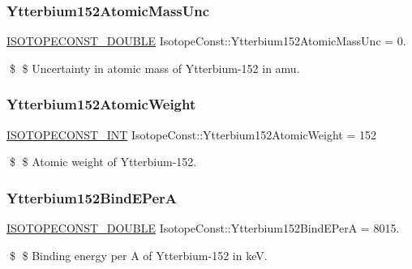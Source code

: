 \subsubsection{\texorpdfstring{Ytterbium152\+Atomic\+Mass\+Unc}{Ytterbium152AtomicMassUnc}}
{\footnotesize\ttfamily \mbox{\hyperlink{group___isotope_const-_macros_ga8f45a7272ce02c0b4c65c44636ed719a}{I\+S\+O\+T\+O\+P\+E\+C\+O\+N\+S\+T\+\_\+\+D\+O\+U\+B\+LE}} Isotope\+Const\+::\+Ytterbium152\+Atomic\+Mass\+Unc = 0.}

\$ \$ Uncertainty in atomic mass of Ytterbium-\/152 in amu. \mbox{\label{group___isotope_const-_ytterbium-_yb152_gaf8dc85b3a3cf625b206d601cdd4a695c}} 
\subsubsection{\texorpdfstring{Ytterbium152\+Atomic\+Weight}{Ytterbium152AtomicWeight}}
{\footnotesize\ttfamily \mbox{\hyperlink{group___isotope_const-_macros_ga5f18360b3e99483a35c32d789e62621c}{I\+S\+O\+T\+O\+P\+E\+C\+O\+N\+S\+T\+\_\+\+I\+NT}} Isotope\+Const\+::\+Ytterbium152\+Atomic\+Weight = 152}

\$ \$ Atomic weight of Ytterbium-\/152. \mbox{\label{group___isotope_const-_ytterbium-_yb152_gaa338021565e100b2696062ef1a542768}} 
\subsubsection{\texorpdfstring{Ytterbium152\+Bind\+E\+PerA}{Ytterbium152BindEPerA}}
{\footnotesize\ttfamily \mbox{\hyperlink{group___isotope_const-_macros_ga8f45a7272ce02c0b4c65c44636ed719a}{I\+S\+O\+T\+O\+P\+E\+C\+O\+N\+S\+T\+\_\+\+D\+O\+U\+B\+LE}} Isotope\+Const\+::\+Ytterbium152\+Bind\+E\+PerA = 8015.}

\$ \$ Binding energy per A of Ytterbium-\/152 in keV. \mbox{\label{group___isotope_const-_ytterbium-_yb152_ga813ba5dd2d15679b069d8beac26f222d}} 
